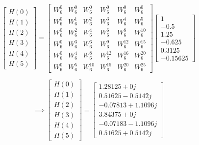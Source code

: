 \documentclass[journal,12pt,twocolumn]{IEEEtran}
\renewcommand\thesection{\arabic{section}}
\begin{document}
\begin{enumerate}[label=\thesection.\arabic*.,ref=\thesection.\theenumi]
\begin{equation}
\begin{bmatrix} 
H(0) \\ 
H(1) \\ 
H(2) \\ 
H(3) \\ 
H(4) \\ 
H(5) 
\end{bmatrix}
=
\begin{bmatrix}
W^{0}_{6} & W^{0}_{6} & W^{0}_{6} & W^{0}_{6} & W^{0}_{6} & W^{0}_{6}\\
W^{0}_{6} & W^{1}_{6} & W^{2}_{6} & W^{3}_{6} & W^{4}_{6} & W^{5}_{6}\\
W^{0}_{6} & W^{2}_{6} & W^{4}_{6} & W^{6}_{6} & W^{8}_{6} & W^{10}_{6}\\
W^{0}_{6} & W^{3}_{6} & W^{6}_{6} & W^{9}_{6} & W^{12}_{6} & W^{15}_{6}\\
W^{0}_{6} & W^{4}_{6} & W^{8}_{6} & W^{12}_{6} & W^{16}_{6} & W^{20}_{6}\\
W^{0}_{6} & W^{5}_{6} & W^{10}_{6} & W^{15}_{6} & W^{20}_{6} & W^{25}_{6} 
\end{bmatrix}
\begin{bmatrix}
1 \\ 
-0.5 \\ 
1.25 \\ 
-0.625 \\ 
0.3125 \\ 
-0.15625
\end{bmatrix}
\end{equation}


\begin{equation}
\implies
\begin{bmatrix} 
H(0) \\ 
H(1) \\ 
H(2) \\ 
H(3) \\ 
H(4) \\ 
H(5) 
\end{bmatrix}
=
\begin{bmatrix}
1.28125+0j \\
0.51625-0.5142j \\ 
-0.07813+1.1096j  \\ 
3.84375+0j \\ 
-0.07183-1.1096j \\ 
0.51625+0.5142j
\end{bmatrix}
\end{equation}



\end{enumerate}
\end{document}
